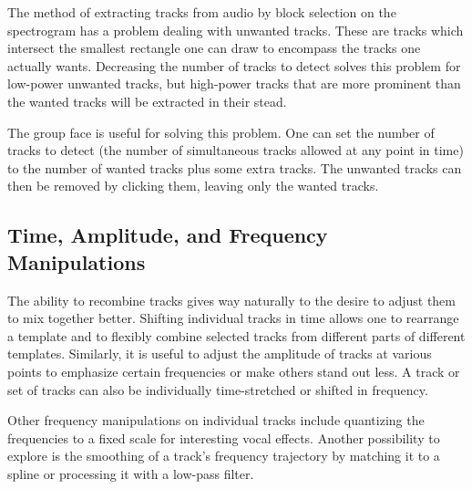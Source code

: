 \documentclass{article}
\begin{document}
The method of extracting tracks from audio by block selection on the
spectrogram has a problem dealing with unwanted tracks. These are
tracks which intersect the smallest rectangle one can draw to encompass the
tracks one actually wants. Decreasing the number of tracks to detect solves
this problem for low-power unwanted tracks, but high-power tracks that are more
prominent than the wanted tracks will be extracted in their stead.

The group face is useful for solving this problem. 
One can set the number of tracks to detect (the number of simultaneous tracks
allowed at any point in time) to the number of wanted tracks plus some extra tracks. 
The unwanted tracks can then be removed by clicking them, leaving
only the wanted tracks.

\subsection{Time, Amplitude, and Frequency Manipulations}

The ability to recombine tracks gives way naturally to the desire to adjust them
to mix together better. Shifting individual tracks in time allows one to rearrange 
a template and to flexibly combine selected tracks from different parts of different 
templates. Similarly, it is useful to adjust the amplitude of tracks 
at various points to emphasize certain frequencies or make others stand out less. 
A track or set of tracks can also be individually time-stretched or shifted in frequency.

Other frequency manipulations on individual tracks include quantizing 
the frequencies to a fixed scale for interesting vocal effects. Another possibility 
to explore is the smoothing of a track's frequency trajectory by matching it to a spline 
or processing it with a low-pass filter. 
 
\end{document}
